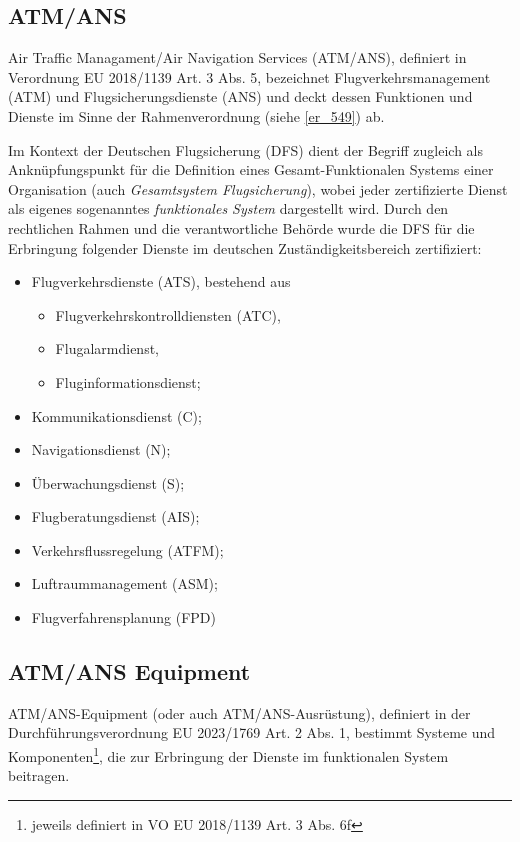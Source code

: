 \subsection{ATM/ANS}

Air Traffic Managament/Air Navigation Services (ATM/ANS), definiert in Verordnung EU 2018/1139 Art. 3 Abs. 5, bezeichnet Flugverkehrsmanagement (ATM) und Flugsicherungsdienste (ANS) und deckt dessen Funktionen und Dienste im Sinne der Rahmenverordnung (siehe \ref{er_549}) ab.


Im Kontext der Deutschen Flugsicherung (DFS) dient der Begriff zugleich als Anknüpfungspunkt für die Definition eines Gesamt-Funktionalen Systems einer Organisation (auch \textit{Gesamtsystem Flugsicherung}), wobei jeder zertifizierte Dienst als eigenes sogenanntes \textit{funktionales System} dargestellt wird.
Durch den rechtlichen Rahmen und die verantwortliche Behörde wurde die DFS für die Erbringung folgender Dienste im deutschen Zuständigkeitsbereich zertifiziert: \cite[17]{ba_technik}
\begin{itemize}
    \item  Flugverkehrsdienste (ATS), bestehend aus
    \begin{itemize}
        \item Flugverkehrskontrolldiensten (ATC),
        \item Flugalarmdienst,
        \item Fluginformationsdienst;
    \end{itemize}
    \item  Kommunikationsdienst (C);
    \item  Navigationsdienst (N);
    \item  Überwachungsdienst (S);
    \item  Flugberatungsdienst (AIS);
    \item  Verkehrsflussregelung (ATFM);
    \item  Luftraummanagement (ASM);
    \item  Flugverfahrensplanung (FPD)
\end{itemize}

\subsection{ATM/ANS Equipment}

ATM/ANS-Equipment (oder auch ATM/ANS-Ausrüstung), definiert in der Durchführungsverordnung EU 2023/1769 Art. 2 Abs. 1, bestimmt Systeme und Komponenten\footnote{jeweils definiert in VO EU 2018/1139 Art. 3 Abs. 6f}, die zur Erbringung der Dienste im funktionalen System beitragen.